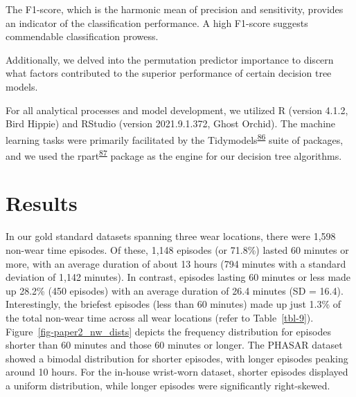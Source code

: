 \documentclass[
  9pt,
]{scrbook}
\begin{document}
The F1-score, which is the harmonic mean of precision and sensitivity,
provides an indicator of the classification performance. A high F1-score
suggests commendable classification prowess.

Additionally, we delved into the permutation predictor importance to
discern what factors contributed to the superior performance of certain
decision tree models.

For all analytical processes and model development, we utilized R
(version 4.1.2, Bird Hippie) and RStudio (version 2021.9.1.372, Ghost
Orchid). The machine learning tasks were primarily facilitated by the
Tidymodels\textsuperscript{\protect\hyperlink{ref-kuhn_tidymodels_2020}{86}}
suite of packages, and we used the
rpart\textsuperscript{\protect\hyperlink{ref-rpart}{87}} package as the
engine for our decision tree algorithms.

\hypertarget{results-1}{%
\section{Results}\label{results-1}}

In our gold standard datasets spanning three wear locations, there were
1,598 non-wear time episodes. Of these, 1,148 episodes (or 71.8\%)
lasted 60 minutes or more, with an average duration of about 13 hours
(794 minutes with a standard deviation of 1,142 minutes). In contrast,
episodes lasting 60 minutes or less made up 28.2\% (450 episodes) with
an average duration of 26.4 minutes (SD = 16.4). Interestingly, the
briefest episodes (less than 60 minutes) made up just 1.3\% of the total
non-wear time across all wear locations (refer to Table~\ref{tbl-9}).
Figure~\ref{fig-paper2_nw_dists} depicts the frequency distribution for
episodes shorter than 60 minutes and those 60 minutes or longer. The
PHASAR dataset showed a bimodal distribution for shorter episodes, with
longer episodes peaking around 10 hours. For the in-house wrist-worn
dataset, shorter episodes displayed a uniform distribution, while longer
episodes were significantly right-skewed.

\begingroup

\footnotesize
\end{document}
